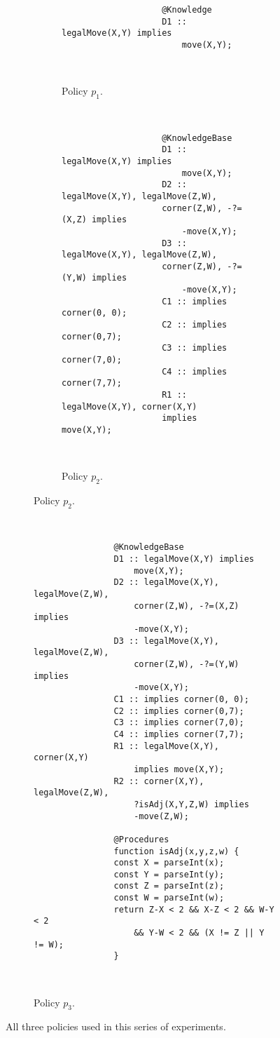 \documentclass[10pt, twocolumn]{article}
\begin{document}
	\begin{figure}[!htb]
		\centering
		\begin{subfigure}{0.45\textwidth}
			\begin{subfigure}{\textwidth}
				\begin{verbatim}
					@Knowledge
					D1 :: legalMove(X,Y) implies
					    move(X,Y);
				\end{verbatim}\ \\[-4\topsep]
				\caption{Policy $p_1$.}
				\label{fig:policyp1}
			\end{subfigure}%
			\ \\[\topsep]
			\begin{subfigure}{\textwidth}
				\begin{verbatim}
					@KnowledgeBase
					D1 :: legalMove(X,Y) implies 
					    move(X,Y);
					D2 :: legalMove(X,Y), legalMove(Z,W),
					corner(Z,W), -?=(X,Z) implies
					    -move(X,Y);
					D3 :: legalMove(X,Y), legalMove(Z,W),
					corner(Z,W), -?=(Y,W) implies
					    -move(X,Y);
					C1 :: implies corner(0, 0);
					C2 :: implies corner(0,7);
					C3 :: implies corner(7,0);
					C4 :: implies corner(7,7);
					R1 :: legalMove(X,Y), corner(X,Y)
					implies move(X,Y);
				\end{verbatim}\ \\[-4\topsep]
				\caption{Policy $p_2$.}
				\label{fig:policyp2}
			\end{subfigure}%
		\end{subfigure}%
		\ \\[\topsep]		
		\begin{subfigure}{0.45\textwidth}
			\begin{verbatim}
				@KnowledgeBase
				D1 :: legalMove(X,Y) implies
				    move(X,Y);
				D2 :: legalMove(X,Y), legalMove(Z,W), 
				    corner(Z,W), -?=(X,Z) implies
				    -move(X,Y);
				D3 :: legalMove(X,Y), legalMove(Z,W), 
				    corner(Z,W), -?=(Y,W) implies
				    -move(X,Y);
				C1 :: implies corner(0, 0);
				C2 :: implies corner(0,7);
				C3 :: implies corner(7,0);
				C4 :: implies corner(7,7);
				R1 :: legalMove(X,Y), corner(X,Y)
				    implies move(X,Y);
				R2 :: corner(X,Y), legalMove(Z,W),
				    ?isAdj(X,Y,Z,W) implies
				    -move(Z,W);
				
				@Procedures
				function isAdj(x,y,z,w) {
				const X = parseInt(x);
				const Y = parseInt(y);
				const Z = parseInt(z);
				const W = parseInt(w);
				return Z-X < 2 && X-Z < 2 && W-Y < 2
				    && Y-W < 2 && (X != Z || Y != W);
				}
			\end{verbatim}\ \\[-4\topsep]
			\caption{Policy $p_3$.}
			\label{fig:policyp3}
		\end{subfigure}%
		\caption{All three policies used in this series of experiments.}
		\label{fig:policies01}
	\end{figure}
	
\end{document}
